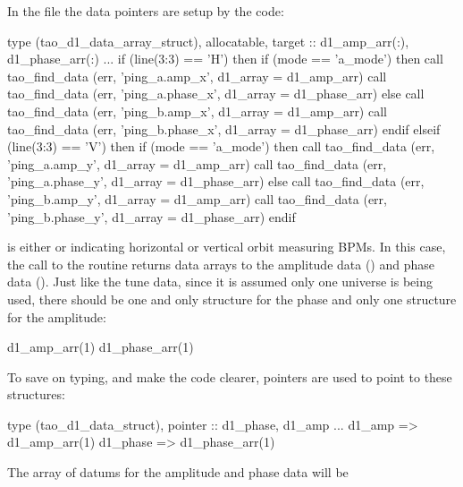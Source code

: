 {{{{{In the  file the data pointers are setup by the code:
\begin{example}
  type (tao_d1_data_array_struct), allocatable, target :: d1_amp_arr(:), d1_phase_arr(:)
  ...
  if (line(3:3) == 'H') then
    if (mode == 'a_mode') then
      call tao_find_data (err, 'ping_a.amp_x', d1_array = d1_amp_arr)
      call tao_find_data (err, 'ping_a.phase_x', d1_array = d1_phase_arr)
    else 
      call tao_find_data (err, 'ping_b.amp_x', d1_array = d1_amp_arr)
      call tao_find_data (err, 'ping_b.phase_x', d1_array = d1_phase_arr)
    endif
  elseif (line(3:3) == 'V') then
    if (mode == 'a_mode') then
      call tao_find_data (err, 'ping_a.amp_y', d1_array = d1_amp_arr)
      call tao_find_data (err, 'ping_a.phase_y', d1_array = d1_phase_arr)
    else 
      call tao_find_data (err, 'ping_b.amp_y', d1_array = d1_amp_arr)
      call tao_find_data (err, 'ping_b.phase_y', d1_array = d1_phase_arr)
    endif
\end{example}
 is either  or  indicating horizontal or vertical orbit
measuring BPMs. In this case, the call to the  routine returns 
data arrays to the amplitude data () and phase data ().
Just like the tune data, since it is assumed only one universe is being used, there should
be one and only  structure for the phase and only one  structure for the amplitude:
\begin{example}
  d1_amp_arr(1)%
  d1_phase_arr(1)%
\end{example}
To save on typing, and make the code clearer, pointers are used to point to these structures:
\begin{example}
  type (tao_d1_data_struct), pointer :: d1_phase, d1_amp
  ...
  d1_amp => d1_amp_arr(1)%
  d1_phase => d1_phase_arr(1)%
\end{example}
The array of datums for the amplitude and phase data will be \vn{d1_amp%
\vn{d1_phase%

}}}}}}}
